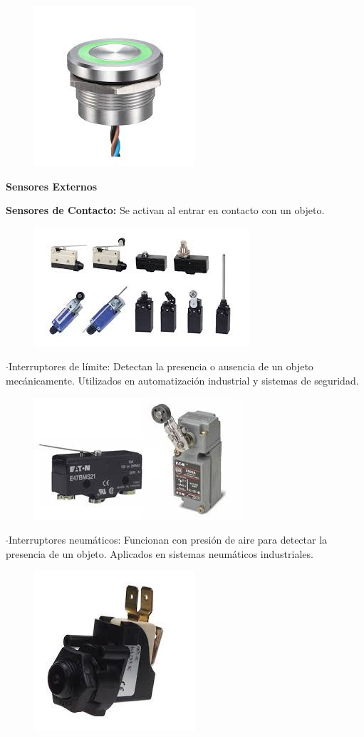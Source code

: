 \begin{figure} [h]
	\centering
	\includegraphics[width=0.3\linewidth]{img/interruptorpiezoelectrico}
	\caption{}
	\label{fig:interruptorpiezoelectrico}
\end{figure}


\textbf{Sensores Externos}


\textbf{ Sensores de Contacto:}
	Se activan al entrar en contacto con un objeto.


\begin{figure} [h]
	\centering
	\includegraphics[width=0.3\linewidth]{img/sensorcontacto}
	\caption{}
	\label{fig:sensorcontacto}
\end{figure}

\newpage
	$\cdot$Interruptores de límite: Detectan la presencia o ausencia de un objeto mecánicamente. Utilizados en automatización industrial y sistemas de seguridad.
	
	
\begin{figure} [h]
	\centering
	\includegraphics[width=0.3\linewidth]{img/interruptorlimite}
	\caption{}
	\label{fig:interruptorlimite}
\end{figure}
	
	
	$\cdot$Interruptores neumáticos: Funcionan con presión de aire para detectar la presencia de un objeto. Aplicados en sistemas neumáticos industriales.
	
	
\begin{figure} [h]
	\centering
	\includegraphics[width=0.3\linewidth]{img/interruptorneumaticp}
	\caption{}
	\label{fig:interruptorneumaticp}
\end{figure}
	
